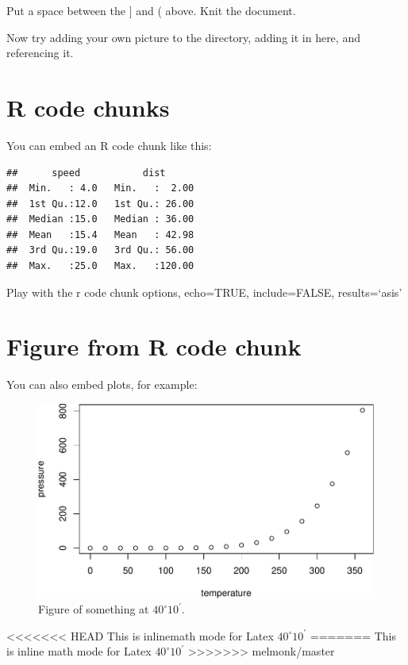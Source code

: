 \documentclass[12pt,]{article}
\begin{document}
Put a space between the {]} and ( above. Knit the document.

Now try adding your own picture to the directory, adding it in here, and
referencing it.

\section{R code chunks}\label{r-code-chunks}

You can embed an R code chunk like this:

\begin{verbatim}
##      speed           dist       
##  Min.   : 4.0   Min.   :  2.00  
##  1st Qu.:12.0   1st Qu.: 26.00  
##  Median :15.0   Median : 36.00  
##  Mean   :15.4   Mean   : 42.98  
##  3rd Qu.:19.0   3rd Qu.: 56.00  
##  Max.   :25.0   Max.   :120.00
\end{verbatim}

Play with the r code chunk options, echo=TRUE, include=FALSE,
results=`asis'

\FloatBarrier

\section{Figure from R code chunk}\label{figure-from-r-code-chunk}

You can also embed plots, for example:

\begin{figure}[htbp]
\centering
\includegraphics{4-Workshop_examples_files/figure-latex/pressure-1.pdf}
\caption{Figure of something at \(40^\circ 10^\prime\).
\label{fig:pressure}}
\end{figure}

<<<<<<< HEAD
This is inlinemath mode for Latex \(40^\circ 10^\prime\)
=======
This is inline math mode for Latex \(40^\circ 10^\prime\)
>>>>>>> melmonk/master
\end{document}
